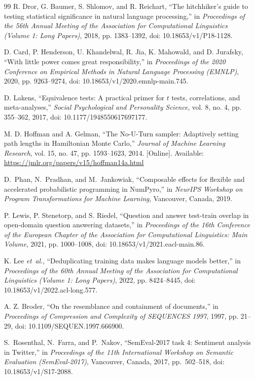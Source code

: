 \begin{thebibliography}{99}
R. Dror, G. Baumer, S. Shlomov, and R. Reichart, ``The hitchhiker's guide to testing statistical significance in natural language processing,'' in \emph{Proceedings of the 56th Annual Meeting of the Association for Computational Linguistics (Volume 1: Long Papers)}, 2018, pp. 1383--1392, doi: 10.18653/v1/P18-1128.

D. Card, P. Henderson, U. Khandelwal, R. Jia, K. Mahowald, and D. Jurafsky, ``With little power comes great responsibility,'' in \emph{Proceedings of the 2020 Conference on Empirical Methods in Natural Language Processing (EMNLP)}, 2020, pp. 9263--9274, doi: 10.18653/v1/2020.emnlp-main.745.

D. Lakens, ``Equivalence tests: A practical primer for $t$ tests, correlations, and meta-analyses,'' \emph{Social Psychological and Personality Science}, vol. 8, no. 4, pp. 355--362, 2017, doi: 10.1177/1948550617697177.

M. D. Hoffman and A. Gelman, ``The {No-U-Turn} sampler: Adaptively setting path lengths in {H}amiltonian {M}onte {C}arlo,'' \emph{Journal of Machine Learning Research}, vol. 15, no. 47, pp. 1593--1623, 2014. [Online]. Available: \url{https://jmlr.org/papers/v15/hoffman14a.html}

D.~Phan, N.~Pradhan, and M.~Jankowiak, ``Composable effects for flexible and accelerated probabilistic programming in NumPyro,'' in \emph{NeurIPS Workshop on Program Transformations for Machine Learning}, Vancouver, Canada, 2019.

P. Lewis, P. Stenetorp, and S. Riedel, ``Question and answer test-train overlap in open-domain question answering datasets,'' in \emph{Proceedings of the 16th Conference of the European Chapter of the Association for Computational Linguistics: Main Volume}, 2021, pp. 1000--1008, doi: 10.18653/v1/2021.eacl-main.86.

K. Lee \emph{et~al.}, ``Deduplicating training data makes language models better,'' in \emph{Proceedings of the 60th Annual Meeting of the Association for Computational Linguistics (Volume 1: Long Papers)}, 2022, pp. 8424--8445, doi: 10.18653/v1/2022.acl-long.577.

A. Z. Broder, ``On the resemblance and containment of documents,'' in \emph{Proceedings of Compression and Complexity of SEQUENCES 1997}, 1997, pp. 21--29, doi: 10.1109/SEQUEN.1997.666900.

S.~Rosenthal, N.~Farra, and P.~Nakov, ``SemEval-2017 task 4: Sentiment analysis in Twitter,'' in \emph{Proceedings of the 11th International Workshop on Semantic Evaluation (SemEval-2017)}, Vancouver, Canada, 2017, pp.~502--518, doi: 10.18653/v1/S17-2088.

\end{thebibliography}
